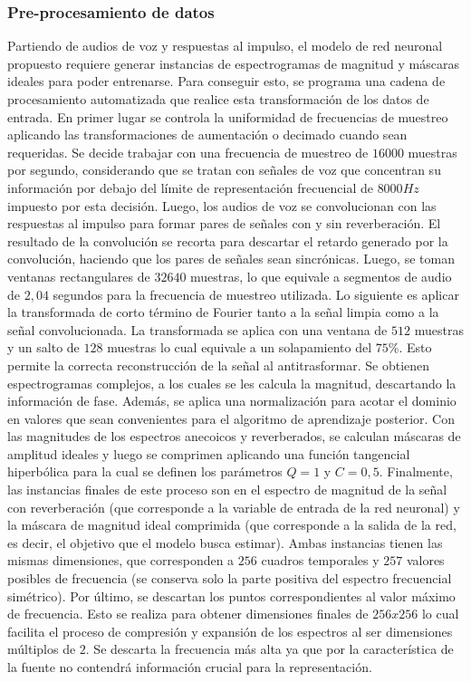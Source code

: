 \subsubsection{Pre-procesamiento de datos}

Partiendo de audios de voz y respuestas al impulso, el modelo de red neuronal propuesto requiere generar instancias de espectrogramas de magnitud y máscaras ideales para poder entrenarse. Para conseguir esto, se programa una cadena de procesamiento automatizada que realice esta transformación de los datos de entrada. 
En primer lugar se controla la uniformidad de frecuencias de muestreo aplicando las transformaciones de aumentación o decimado cuando sean requeridas. Se decide trabajar con una frecuencia de muestreo de $16000$ muestras por segundo, considerando que se tratan con señales de voz que concentran su información por debajo del límite de representación frecuencial de $8000 Hz$ impuesto por esta decisión. 
Luego, los audios de voz se convolucionan con las respuestas al impulso para formar pares de señales con y sin reverberación. El resultado de la convolución se recorta para descartar el retardo generado por la convolución, haciendo que los pares de señales sean sincrónicas. Luego, se toman ventanas rectangulares de $32640$ muestras, lo que equivale a segmentos de audio de $2,04$ segundos para la frecuencia de muestreo utilizada. Lo siguiente es aplicar la transformada de corto término de Fourier tanto a la señal limpia como a la señal convolucionada. La transformada se aplica con una ventana de $512$ muestras y un salto de $128$ muestras lo cual equivale a un solapamiento del $75\%$. Esto permite la correcta reconstrucción de la señal al antitrasformar. Se obtienen espectrogramas complejos, a los cuales se les calcula la magnitud, descartando la información de fase. Además, se aplica una normalización para acotar el dominio en valores que sean convenientes para el algoritmo de  aprendizaje posterior. Con las magnitudes de los espectros anecoicos y reverberados, se calculan máscaras de amplitud ideales y luego se comprimen aplicando una función tangencial hiperbólica para la cual se definen los parámetros $Q=1$ y $C=0,5$. Finalmente, las instancias finales de este proceso son en el espectro de magnitud de la señal con reverberación (que corresponde a la variable de entrada de la red neuronal) y la máscara de magnitud ideal comprimida (que corresponde a la salida de la red, es decir, el objetivo que el modelo busca estimar). Ambas instancias tienen las mismas dimensiones, que corresponden a $256$ cuadros temporales y $257$ valores posibles de frecuencia (se conserva solo la parte positiva del espectro frecuencial simétrico). Por último, se descartan los puntos correspondientes al valor máximo de frecuencia. Esto se realiza para obtener dimensiones finales de $256x256$ lo cual facilita el proceso de compresión y expansión de los espectros al ser dimensiones múltiplos de $2$. Se descarta la frecuencia más alta ya que por la característica de la fuente  no contendrá información crucial para la representación.  


